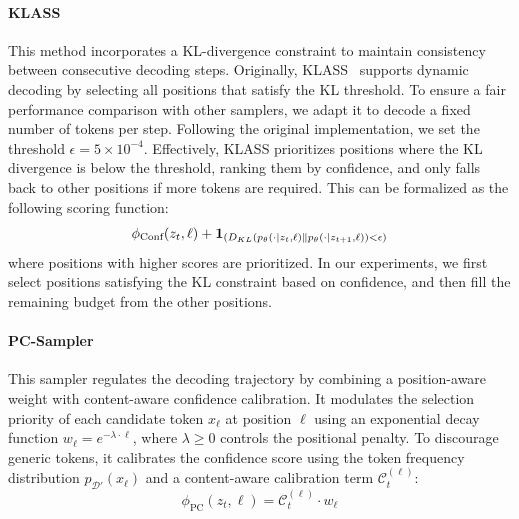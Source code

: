 \paragraph{KLASS~\cite{kim2025klass}} This method incorporates a KL-divergence constraint to maintain consistency between consecutive decoding steps. Originally, KLASS~\cite{kim2025klass} supports dynamic decoding by selecting all positions that satisfy the KL threshold. To ensure a fair performance comparison with other samplers, we adapt it to decode a fixed number of tokens per step. Following the original implementation, we set the threshold $\epsilon = 5 \times 10^{-4}$. Effectively, KLASS prioritizes positions where the KL divergence is below the threshold, ranking them by confidence, and only falls back to other positions if more tokens are required. This can be formalized as the following scoring function:
\begin{equation}
    \phi_{\text{Conf}}(z_t, \ell)+\textbf{1}_{(D_{KL}(p_\theta(\cdot \mid z_t, \ell) \| p_\theta(\cdot \mid z_{t+1}, \ell)) < \epsilon)} \\
\end{equation}
where positions with higher scores are prioritized. In our experiments, we first select positions satisfying the KL constraint based on confidence, and then fill the remaining budget from the other positions.

\paragraph{PC-Sampler~\cite{huang2025pc}} This sampler regulates the decoding trajectory by combining a position-aware weight with content-aware confidence calibration. It modulates the selection priority of each candidate token $x_\ell$ at position $\ell$ using an exponential decay function $w_\ell = e^{-\lambda \cdot \ell}$, where $\lambda \ge 0$ controls the positional penalty. To discourage generic tokens, it calibrates the confidence score using the token frequency distribution $p_{\mathcal{D}'}(x_\ell)$ and a content-aware calibration term $\mathcal{C}^{(\ell)
}_t$:
\begin{equation}
    \phi_{\text{PC}}(z_t, \ell) = \mathcal{C}^{(\ell)
}_t \cdot w_\ell
\end{equation}

